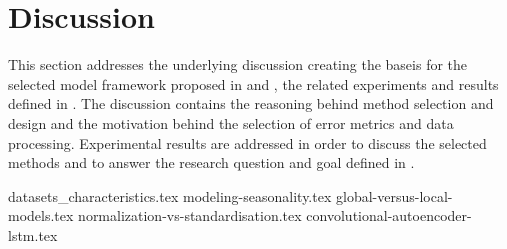 
\section{Discussion}
\label{section:Discussion:Discussion}

This section addresses the underlying discussion creating the baseis for the selected model framework proposed in  and ,
the related experiments and results defined in .
The discussion contains the reasoning behind method selection and design
and the motivation behind the selection of error metrics and data processing.
Experimental results are addressed in order to discuss the selected methods and to answer the research question and goal defined in .


\iffalse
  This section presents the underlying discussion creating the basis for the model framework proposed in \Cref{section:Architecture}.
  The discussion concerns the current state of time-series prediction, the motivation behind the method selection, model structure, and the selected error metric.
  This section intendeds to answer the research questions proposed in this thesis,
  as well as the reason behind the framework.
\fi




{datasets_characteristics.tex}
{modeling-seasonality.tex}
{global-versus-local-models.tex}
{normalization-vs-standardisation.tex}
{convolutional-autoencoder-lstm.tex}














